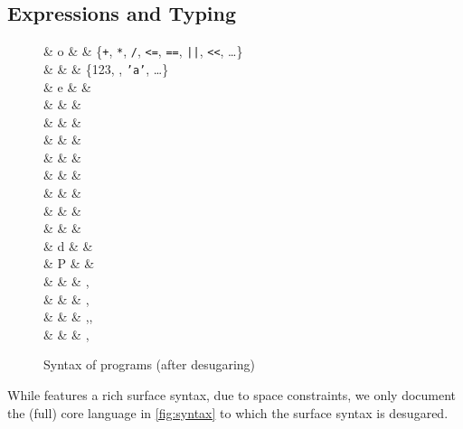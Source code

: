 \documentclass[9pt\ifFinal\else,preprint,nocopyrightspace\fi,\ifAlpha\else natbib,authoryear\fi]{sigplanconf}
\begin{document}
\subsection{Expressions and Typing}
\begin{figure}
\begin{grammar}
         & o              & \in       & \{\texttt{+}, \texttt{*}, \texttt{/}, \texttt{<=}, \texttt{==}, \texttt{||}, \texttt{{<}<}, \dots\} \\
        & \ell           & \in       & \{123, , \texttt{'a'}, \dots\} \\
     & e              & \Coloneqq &  \alt \Unit \alt {} \alt {} \alt {} \\
                       &                & \alt      &  \\
                       &                & \alt      &  \\
&                & \alt      &  \\
                       &                & \alt      & \ell \alt {} \alt {} \\
                       &                & \alt      &  \\
                       &                & \alt      &  \alt {} \\
                       &                & \alt      &  \alt {} \alt {} \\
                       &                & \alt      &  \\
   & d              & \Coloneqq &  \alt {} \\
        & P              & \Coloneqq & \\
  &                & \ni       & ,  \\
       &                & \ni       & ,  \\
    &                & \ni       & ,, \\
   &                & \ni       & ,  \\
\end{grammar}

\caption{Syntax of \CDSL programs (after desugaring)}
\label{fig:syntax}
\end{figure}
\noindent 
While \CDSL features a rich surface syntax, due to space constraints, we only document the (full) core language in \autoref{fig:syntax} to which the surface syntax is desugared.
\end{document}
